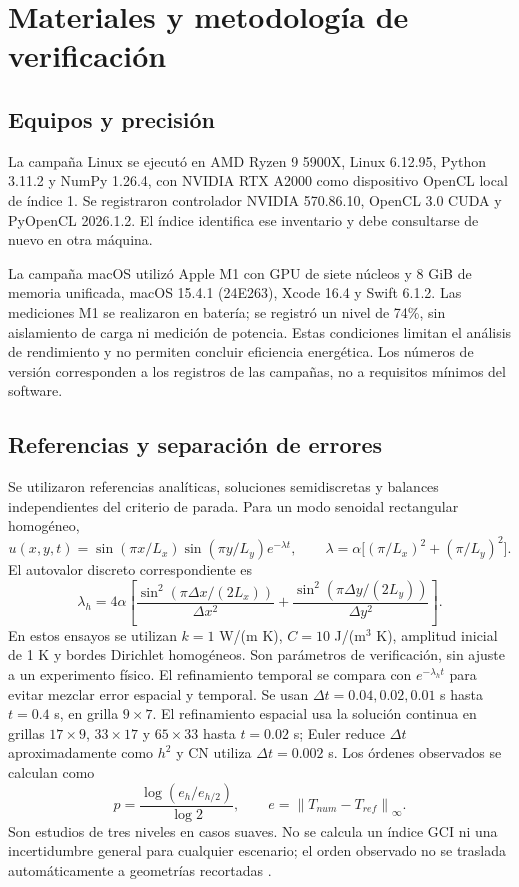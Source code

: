\documentclass[11pt,a4paper]{article}
\newcommand{\norm}[1]{\left\lVert#1\right\rVert}
\newcommand{\dt}{\Delta t}
\begin{document}
\section{Materiales y metodología de verificación}
\subsection{Equipos y precisión}
La campaña Linux se ejecutó en AMD Ryzen 9 5900X, Linux 6.12.95, Python 3.11.2 y NumPy 1.26.4, con NVIDIA RTX A2000 como dispositivo OpenCL local de índice 1. Se registraron controlador NVIDIA 570.86.10, OpenCL 3.0 CUDA y PyOpenCL 2026.1.2. El índice identifica ese inventario y debe consultarse de nuevo en otra máquina.

La campaña macOS utilizó Apple M1 con GPU de siete núcleos y 8 GiB de memoria unificada, macOS 15.4.1 (24E263), Xcode 16.4 y Swift 6.1.2. Las mediciones M1 se realizaron en batería; se registró un nivel de 74\%, sin aislamiento de carga ni medición de potencia. Estas condiciones limitan el análisis de rendimiento y no permiten concluir eficiencia energética. Los números de versión corresponden a los registros de las campañas, no a requisitos mínimos del software.

\subsection{Referencias y separación de errores}
Se utilizaron referencias analíticas, soluciones semidiscretas y balances independientes del criterio de parada. Para un modo senoidal rectangular homogéneo,
\begin{equation}
 u(x,y,t)=\sin(\pi x/L_x)\sin(\pi y/L_y)e^{-\lambda t},\qquad
 \lambda=\alpha\big[(\pi/L_x)^2+(\pi/L_y)^2\big].
\end{equation}
El autovalor discreto correspondiente es
\begin{equation}
 \lambda_h=4\alpha\left[\frac{\sin^2(\pi\Delta x/(2L_x))}{\Delta x^2}+\frac{\sin^2(\pi\Delta y/(2L_y))}{\Delta y^2}\right].
\end{equation}
En estos ensayos se utilizan $k=1$ W/(m K), $C=10$ J/(m$^3$ K), amplitud inicial de 1 K y bordes Dirichlet homogéneos. Son parámetros de verificación, sin ajuste a un experimento físico. El refinamiento temporal se compara con $e^{-\lambda_ht}$ para evitar mezclar error espacial y temporal. Se usan $\dt=0.04,0.02,0.01$ s hasta $t=0.4$ s, en grilla $9\times7$. El refinamiento espacial usa la solución continua en grillas $17\times9$, $33\times17$ y $65\times33$ hasta $t=0.02$ s; Euler reduce $\dt$ aproximadamente como $h^2$ y CN utiliza $\dt=0.002$ s. Los órdenes observados se calculan como
\begin{equation}
 p=\frac{\log(e_h/e_{h/2})}{\log2},\qquad e=\norm{T_{num}-T_{ref}}_\infty.
 \label{eq:order}
\end{equation}
Son estudios de tres niveles en casos suaves. No se calcula un índice GCI ni una incertidumbre general para cualquier escenario; el orden observado no se traslada automáticamente a geometrías recortadas \cite{nasa-grid}.
\end{document}
